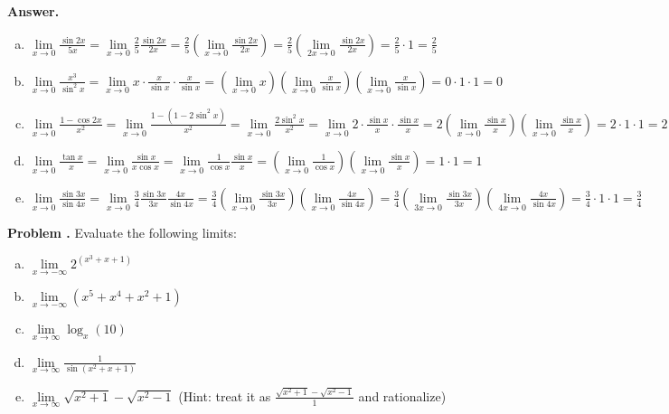\documentclass[11pt,letterpaper]{article}
\newcounter{problem}
\newcommand{\problem}{
	\stepcounter{problem}%
	\noindent \textbf{Problem \theproblem. }%
}
\newcommand{\answer}{\noindent \textbf{Answer. }}
\begin{document}
\answer
\begin{enumerate}[(a)]
    \item $\lim\limits_{x \to 0} \frac{\sin 2x}{5x} = \lim\limits_{x \to 0} \frac{2}{5}\frac{\sin 2x}{2x} = \frac{2}{5}\left(\lim\limits_{x \to 0} \frac{\sin 2x}{2x}\right) = \frac{2}{5}\left(\lim\limits_{2x \to 0} \frac{\sin 2x}{2x}\right) = \frac{2}{5} \cdot 1 = \frac{2}{5}$
    \item $\lim\limits_{x \to 0} \frac{x^3}{\sin^2 x} = \lim\limits_{x \to 0} x \cdot \frac{x}{\sin x} \cdot \frac{x}{\sin x} = \left(\lim\limits_{x \to 0} x\right) \left(\lim\limits_{x \to 0}  \frac{x}{\sin x}\right) \left(\lim\limits_{x \to 0}  \frac{x}{\sin x}\right) = 0 \cdot 1 \cdot 1 = 0$
    \item $\lim\limits_{x \to 0} \frac{1- \cos 2x}{x^2} = \lim\limits_{x \to 0} \frac{1- (1-2\sin^2 x)}{x^2} = \lim\limits_{x \to 0} \frac{2\sin^2 x}{x^2} = \lim\limits_{x \to 0} 2\cdot \frac{\sin x}{x} \cdot \frac{\sin x}{x} = 2\left(\lim\limits_{x \to 0}  \frac{\sin x}{x}\right) \left(\lim\limits_{x \to 0}  \frac{\sin x}{x}\right) = 2 \cdot 1 \cdot 1 = 2$
    \item $\lim\limits_{x \to 0} \frac{\tan x}{x} = \lim\limits_{x \to 0} \frac{\sin x}{x\cos x} = \lim\limits_{x \to 0} \frac{1}{\cos x} \frac{\sin x}{x} = \left(\lim\limits_{x \to 0}  \frac{1}{\cos x}\right) \left(\lim\limits_{x \to 0}  \frac{\sin x}{x}\right) = 1 \cdot 1 = 1$
    \item $\lim\limits_{x \to 0} \frac{\sin 3x}{\sin 4x} = \lim\limits_{x \to 0} \frac{3}{4}\frac{\sin 3x}{3x}\frac{4x}{\sin 4x} = \frac{3}{4}\left(\lim\limits_{x \to 0}  \frac{\sin 3x}{3x}\right) \left(\lim\limits_{x \to 0}  \frac{4x}{\sin 4x}\right) = \frac{3}{4}\left(\lim\limits_{3x \to 0}  \frac{\sin 3x}{3x}\right) \left(\lim\limits_{4x \to 0}  \frac{4x}{\sin 4x}\right) = \frac{3}{4} \cdot 1 \cdot 1 = \frac{3}{4}$
\end{enumerate}\vspace{6mm}

\problem Evaluate the following limits:
\begin{enumerate}[(a)]
    \item $\lim\limits_{x \to -\infty} 2^{(x^3+x+1)}$
    \item $\lim\limits_{x \to -\infty} (x^5+x^4+x^2+1)$
    \item $\lim\limits_{x \to \infty} \log_{x}(10)$
    \item $\lim\limits_{x \to \infty} \frac{1}{\sin(x^2+x+1)}$
    \item $\lim\limits_{x \to \infty} \sqrt{x^2 + 1} - \sqrt{x^2 - 1}$ \quad (Hint: treat it as $\frac{\sqrt{x^2 + 1} - \sqrt{x^2 - 1}}{1}$ and rationalize)
\end{enumerate}\vspace{6mm}
\end{document}
